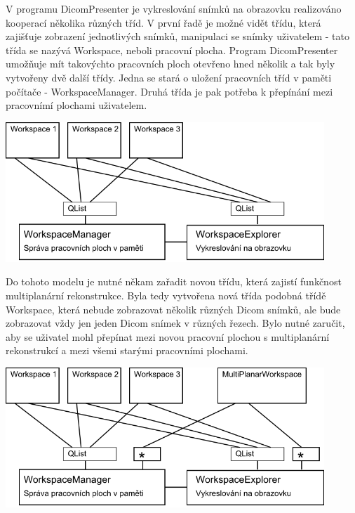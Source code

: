 V programu DicomPresenter je vykreslování snímků na obrazovku realizováno kooperací několika různých tříd. V první řadě je možné vidět třídu, která zajišťuje zobrazení jednotlivých snímků, manipulaci se snímky uživatelem - tato třída se nazývá Workspace, neboli pracovní plocha. Program DicomPresenter umožňuje mít takovýchto pracovních ploch otevřeno hned několik a tak byly vytvořeny dvě další třídy. Jedna se stará o uložení pracovních tříd v paměti počítače - WorkspaceManager. Druhá třída je pak potřeba k přepínání mezi pracovnímí plochami uživatelem.

\includegraphics[width=0.9\textwidth]{Text/IMG/WorkspaceManager.png}

Do tohoto modelu je nutné někam zařadit novou třídu, která zajistí funkčnost multiplanární rekonstrukce. Byla tedy vytvořena nová třída podobná třídě Workspace, která nebude zobrazovat několik různých Dicom snímků, ale bude zobrazovat vždy jen jeden Dicom snímek v různých řezech. Bylo nutné zaručit, aby se uživatel mohl přepínat mezi novou pracovní plochou s multiplanární rekonstrukcí a mezi všemi starými pracovními plochami.

\includegraphics[width=0.9\textwidth]{Text/IMG/MultiPlanar.png}


